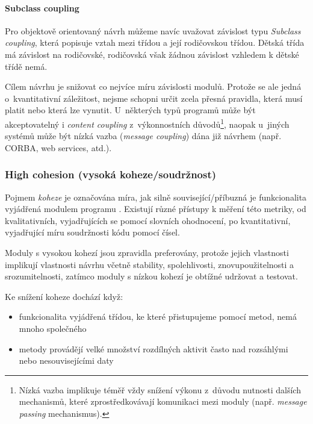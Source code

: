 \vspace{0.5cm}

\paragraph{Subclass coupling} Pro objektově orientovaný návrh můžeme navíc uvažovat závislost typu \emph{Subclass coupling}, která popisuje vztah mezi třídou a její rodičovskou třídou. Dětská třída má závislost na rodičovské, rodičovská však žádnou závislost vzhledem k dětské třídě nemá.

\vspace{1.0cm}

Cílem návrhu je snižovat co nejvíce míru závislosti modulů. Protože se ale jedná o~kvantitativní záležitost, nejsme schopni určit zcela přesná pravidla, která musí platit nebo která lze vynutit. U~některých typů programů může být akceptovatelný i \emph{content coupling} z~výkonnostních důvodů\footnote{Nízká vazba implikuje téměř vždy snížení výkonu z~důvodu nutnosti dalších mechanismů, které zprostředkovávají komunikaci mezi moduly (např. \emph{message passing} mechanismus).}, naopak u~jiných systémů může být nízká vazba (\emph{message coupling}) dána již návrhem (např. CORBA, web services, atd.).

\subsubsection{High cohesion (vysoká koheze/soudržnost)}
Pojmem \emph{koheze} je označována míra, jak silně související/příbuzná je funkcionalita vyjádřená modulem programu \cite{wiki:cohesion}. Existují různé přístupy k měření této metriky, od kvalitativních, vyjadřujících se pomocí slovních ohodnocení, po kvantitativní, vyjadřující míru soudržnosti kódu pomocí čísel.

Moduly s vysokou kohezí jsou zpravidla preferovány, protože jejich vlastnosti implikují  vlastnosti návrhu včetně stability, spolehlivosti, znovupoužitelnosti a srozumitelnosti, zatímco moduly s nízkou kohezí je obtížné udržovat a testovat.

Ke snížení koheze dochází když:
\begin{itemize}
\item funkcionalita vyjádřená třídou, ke které přistupujeme pomocí metod, nemá mnoho společného
\item metody provádějí velké množství rozdílných aktivit často nad rozsáhlými nebo nesouvisejícími daty
\end{itemize}

